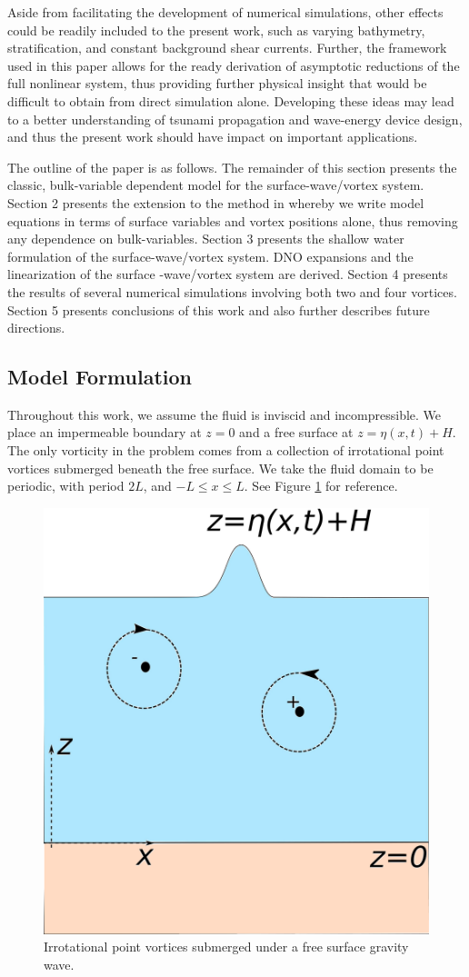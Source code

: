 \documentclass[a4paper,11pt]{article}
\begin{document}
Aside from facilitating the development of numerical simulations, other effects could be readily included to the present work, such as varying bathymetry, stratification, and constant background shear currents.  Further, the framework used in this paper allows for the ready derivation of asymptotic reductions of the full nonlinear system, thus providing further physical insight that would be difficult to obtain from direct simulation alone. Developing these ideas may lead to a better understanding of tsunami propagation and wave-energy device design, and thus the present work should have impact on important applications.    

The outline of the paper is as follows.  The remainder of this section presents the classic, bulk-variable dependent model for the surface-wave/vortex system.  Section 2 presents the extension to the method in \cite{afm} whereby we write model equations in terms of surface variables and vortex positions alone, thus removing any dependence on bulk-variables.  Section 3 presents the shallow water formulation of the surface-wave/vortex system.  DNO expansions and the linearization of the surface -wave/vortex system are derived.  Section 4 presents the results of several numerical simulations involving both two and four vortices.  Section 5 presents conclusions of this work and also further describes future directions.  
  
\subsection{Model Formulation}
Throughout this work, we assume the fluid is inviscid and incompressible.  We place an impermeable boundary at $z=0$ and a free surface at $z=\eta(x,t)+H$.  The only vorticity in the problem comes from a collection of irrotational point vortices submerged beneath the free surface.  We take the fluid domain to be periodic, with period $2L$, and $-L\leq x \leq L$.  See Figure \ref{fig:vortex} for reference.  
\begin{figure}
\centering
\includegraphics[width=.3\textwidth]{surface_vortex_9_19}
\caption{\small Irrotational point vortices submerged under a free surface gravity wave.}
\label{fig:vortex}
\end{figure}
\end{document}
